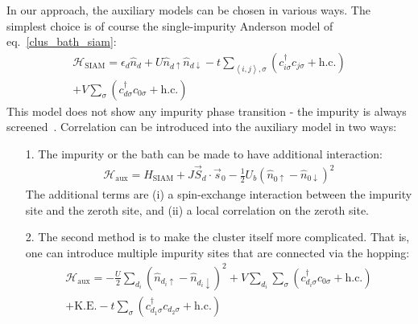 \documentclass[reprint,hidelinks,onecolumn]{revtex4-2}
\begin{document}
In our approach, the auxiliary models can be chosen in various ways. The simplest choice is of course the single-impurity Anderson model of eq.~\ref{clus_bath_siam}:
\begin{equation}\begin{aligned}
\mathcal{H}_\text{SIAM} = \epsilon_d \hat n_d + U \hat n_{d \uparrow} \hat n_{d \downarrow} - t\sum_{\left<i,j \right>, \sigma}\left(c^\dagger_{i\sigma}c_{j\sigma} + \text{h.c.}\right) \\
+ V\sum_\sigma \left( c^\dagger_{d\sigma}c_{0\sigma} + \text{h.c.}\right) 
\end{aligned}\end{equation}
This model does not show any impurity phase transition - the impurity is always screened~\cite{hrk_wilson_1980,wilson1975,bullaNRGreview}. Correlation can be introduced into the auxiliary model in two ways:
\begin{itemize}
	\item[1.] The impurity or the bath can be made to have additional interaction: 
\begin{gather}
\mathcal{H}_\text{aux} = H_\text{SIAM} + J \vec{S}_d\cdot\vec{s}_0 - \frac{1}{2}U_b \left(\hat n_{0 \uparrow} - \hat n_{0 \downarrow}\right)^2
\end{gather}
The additional terms are (i) a spin-exchange interaction between the impurity site and the zeroth site, and (ii) a local correlation on the zeroth site.
\item[2.] The second method is to make the cluster itself more complicated. That is, one can introduce multiple impurity sites that are connected via the hopping:
	\begin{equation}\begin{aligned}
	\mathcal{H}_\text{aux} = -\frac{U}{2}\sum_{d_i}\left(\hat n_{d_i \uparrow} - \hat n_{d_i \downarrow}\right) ^2 + V\sum_{d_i}\sum_\sigma\left( c^\dagger_{d_i\sigma}c_{0\sigma} + \text{h.c.} \right) \\
	+ \text{K.E.} - t\sum_{\sigma}\left(c^\dagger_{d_1\sigma}c_{d_2\sigma} + \text{h.c.}\right)
	\end{aligned}\end{equation}
	
\end{itemize}
\end{document}
